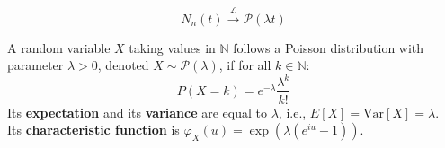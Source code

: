\[ N_n(t) \xrightarrow{\mathcal{L}} \mathcal{P}(\lambda t) \]%
\begin{remark}
A random variable $X$ taking values in $\mathbb{N}$ follows a Poisson distribution with parameter $\lambda > 0$, denoted $X \sim \mathcal{P}(\lambda)$, if for all $k \in \mathbb{N}$:
\[ P(X=k) = e^{-\lambda} \frac{\lambda^k}{k!} \]
Its \textbf{expectation} and its \textbf{variance} are equal to $\lambda$, i.e., $E[X] = \text{Var}[X] = \lambda$.\\
Its \textbf{characteristic function} is $\varphi_X(u) = \exp(\lambda(e^{iu}-1))$.
\end{remark}%
